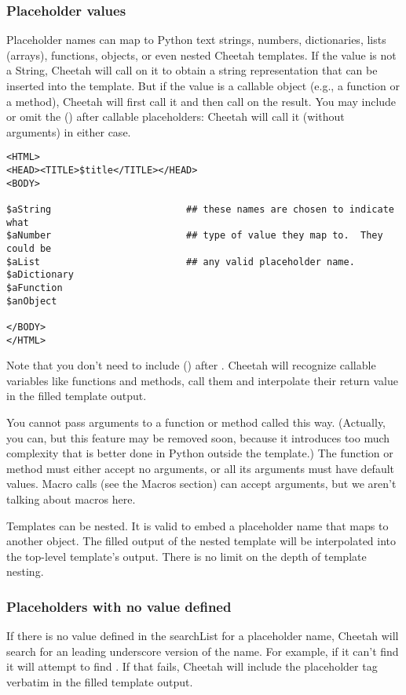 \begin{enumerate}
\subsubsection{Placeholder values}

Placeholder names can map to Python text strings, numbers, dictionaries, lists
(arrays), functions, objects, or even nested Cheetah templates.  If the value is
not a String, Cheetah will call  on it to obtain a string
representation that can be inserted into the template.  But if the value is a
callable object (e.g., a function or a method), Cheetah will first call it and
then call  on the result.  You may include or omit the () after
callable placeholders: Cheetah will call it (without arguments) in either case.


\begin{verbatim}
<HTML>
<HEAD><TITLE>$title</TITLE></HEAD>
<BODY>

$aString                        ## these names are chosen to indicate what
$aNumber                        ## type of value they map to.  They could be
$aList                          ## any valid placeholder name.
$aDictionary
$aFunction
$anObject

</BODY>
</HTML>
\end{verbatim}

Note that you don't need to include () after .  Cheetah
will recognize callable variables like functions and methods, call them and
interpolate their return value in the filled template output.

You cannot pass arguments to a function or method called this way.  (Actually,
you can, but this feature may be removed soon, because it introduces too much
complexity that is better done in Python outside the template.)  The function or
method must either accept no arguments, or all its arguments must have default
values.  Macro calls (see the Macros section) can accept arguments, but we
aren't talking about macros here.

Templates can be nested. It is valid to embed a placeholder name that maps to
another  object.  The filled output of the nested template will be
interpolated into the top-level template's output.  There is no limit on the
depth of template nesting.

\subsubsection{Placeholders with no value defined}
If there is no value defined in the searchList for a placeholder name,
Cheetah will search for an leading underscore version of the name.  For
example, if it can't find  it will attempt to find
.  If that fails, Cheetah will include the placeholder
tag verbatim in the filled template output.


\end{enumerate}

